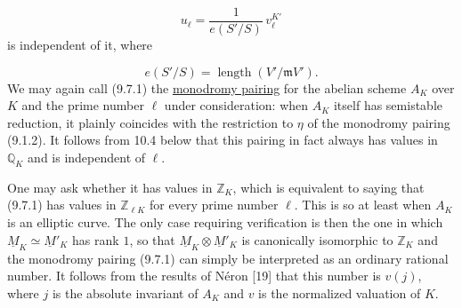 \begin{equation*}
u_\ell=\frac{1}{e(S'/S)}\,v_\ell^{K'}
\end{equation*}
is independent of it, where

\begin{equation*}
e(S'/S)=\operatorname{length}(V'/\mathfrak mV').
\end{equation*}
We may again call (9.7.1) the \underline{monodromy pairing} for the
abelian scheme $A_K$ over $K$ and the prime number $\ell$ under
consideration: when $A_K$ itself has semistable reduction, it plainly
coincides with the restriction to $\eta$ of the monodromy pairing (9.1.2).
It follows from 10.4 below that this pairing in fact always has values in
$\mathbb Q_K$ and is independent of $\ell$.

One may ask whether it has values in $\mathbb Z_K$, which is equivalent to
saying that (9.7.1) has values in $\mathbb Z_{\ell K}$ for every prime
number $\ell$. This is so at least when $A_K$ is an elliptic curve. The
only case requiring verification is then the one in which
$\underline M_K\simeq\underline M'_K$ has rank $1$, so that
$\underline M_K\otimes\underline M'_K$ is canonically isomorphic to
$\mathbb Z_K$ and the monodromy pairing (9.7.1) can simply be interpreted
as an ordinary rational number. It follows from the results of Néron [19]
that this number is $v(j)$, where $j$ is the absolute invariant of $A_K$
and $v$ is the normalized valuation of $K$.

